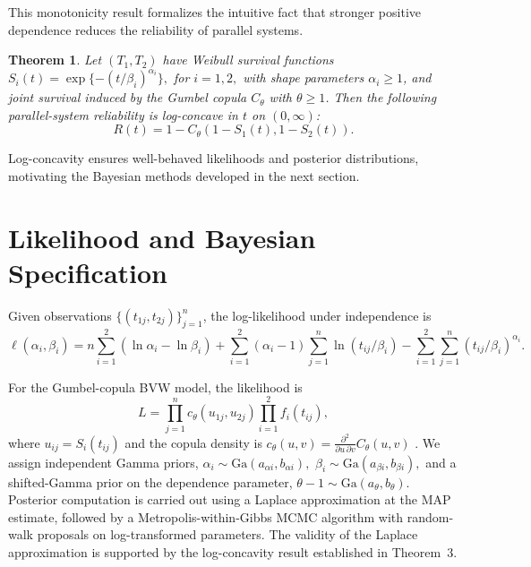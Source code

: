 \documentclass[twoside]{article}
\theoremstyle{plain}
\newtheorem{theorem}{Theorem}[section]
\theoremstyle{definition}
\begin{document}
This monotonicity result formalizes the intuitive fact that stronger positive dependence reduces the reliability of parallel systems.
\begin{theorem}
Let $(T_1,T_2)$ have Weibull survival functions
$  
S_i(t)=\exp\{-(t/\beta_i)^{\alpha_i}\},$  
for $i=1,2, $
with shape parameters $\alpha_i\ge1$, and joint survival induced by the Gumbel copula $C_\theta$ with $\theta\ge1$.
Then the following parallel-system reliability is log-concave in $t$ on $(0,\infty)$:
\begin{equation}
R(t)=1-C_\theta(1-S_1(t),1-S_2(t)).
\end{equation}
\end{theorem}
Log-concavity ensures well-behaved likelihoods and posterior distributions, motivating the Bayesian methods developed in the next section.
\section{Likelihood and Bayesian Specification}
Given observations $\{(t_{1j},t_{2j})\}_{j=1}^n$, the log-likelihood under independence is
\begin{equation}
\ell(\alpha_i,\beta_i)
=
n\sum_{i=1}^2 (\ln \alpha_i - \ln \beta_i)
+
\sum_{i=1}^2 (\alpha_i - 1)\sum_{j=1}^n \ln(t_{ij}/\beta_i)
-
\sum_{i=1}^2 \sum_{j=1}^n (t_{ij}/\beta_i)^{\alpha_i}.
\end{equation}

For the Gumbel-copula BVW model, the likelihood is
\begin{equation}
L
=
\prod_{j=1}^n c_\theta(u_{1j},u_{2j})
\prod_{i=1}^2 f_i(t_{ij}),
\end{equation}
where $u_{ij}=S_i(t_{ij})$ and the copula density is
$  
c_\theta(u,v)=\frac{\partial^2}{\partial u\,\partial v} C_\theta(u,v)$
 .
  We assign independent Gamma priors,
$  
\alpha_i \sim \mathrm{Ga}(a_{\alpha i}, b_{\alpha i}), \,\,
\beta_i \sim \mathrm{Ga}(a_{\beta i}, b_{\beta i}),
$  
and a shifted-Gamma prior on the dependence parameter,
$ 
\theta - 1 \sim \mathrm{Ga}(a_\theta, b_\theta).
$  
Posterior computation is carried out using a Laplace approximation at the MAP estimate, followed by a Metropolis-within-Gibbs MCMC algorithm with random-walk proposals on log-transformed parameters. The validity of the Laplace approximation is supported by the log-concavity result established in Theorem~3.
\end{document}
